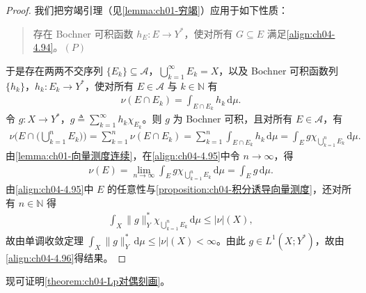 \documentclass[../../main.tex]{subfiles}%
\begin{document}
\begin{proof}
我们把穷竭引理（见\cref{lemma:ch01-穷竭}）应用于如下性质：
\begin{quote}
存在 Bochner 可积函数 $h_E:E\to Y^*$，使对所有 $G\subseteq E$ 满足\eqref{align:ch04-4.94}。\hfill$(P)$
\end{quote}
于是存在两两不交序列 $\{E_k\}\subseteq\mathcal{A}$，$\bigcup_{k=1}^\infty E_k=X$，以及 Bochner 可积函数列 $\{h_k\}$，$h_k:E_k\to Y^*$，使对所有 $E\in\mathcal{A}$ 与 $k\in\mathbb{N}$ 有
\begin{align*}
\nu(E\cap E_k)=\int_{E\cap E_k}h_k\,\mathrm{d}\mu.
\end{align*}
令 $g:X\to Y^*$，$g\triangleq \sum_{k=1}^\infty h_k\chi_{E_k}$。则 $g$ 为 Bochner 可积，且对所有 $E\in\mathcal{A}$，有
\begin{align}
\nu\Big(E\cap\Big(\bigcup_{k=1}^n E_k\Big)\Big)=\sum_{k=1}^n\nu(E\cap E_k)=\sum_{k=1}^n\int_{E\cap E_k}h_k\,\mathrm{d}\mu=\int_E g\chi_{\bigcup_{k=1}^n E_k}\,\mathrm{d}\mu. \label{align:ch04-4.95}
\end{align}
由\cref{lemma:ch01-向量测度连续}，在\eqref{align:ch04-4.95}中令 $n\to\infty$，得
\begin{align}
\nu(E)=\lim_{n\to\infty}\int_E g\chi_{\bigcup_{k=1}^n E_k}\,\mathrm{d}\mu=\int_E g\,\mathrm{d}\mu. \label{align:ch04-4.96}
\end{align}
由\eqref{align:ch04-4.95}中 $E$ 的任意性与\cref{proposition:ch04-积分诱导向量测度}，还对所有 $n\in\mathbb{N}$ 得
\begin{align*}
\int_X\|g\|_Y^*\chi_{\bigcup_{k=1}^n E_k}\,\mathrm{d}\mu\leqslant|\nu|(X),
\end{align*}
故由单调收敛定理 $\int_X\|g\|_Y^*\,\mathrm{d}\mu\leqslant|\nu|(X)<\infty$。由此 $g\in L^1(X;Y^*)$，故由\eqref{align:ch04-4.96}得结果。
\end{proof}

现可证明\cref{theorem:ch04-Lp对偶刻画}。
\end{document}
